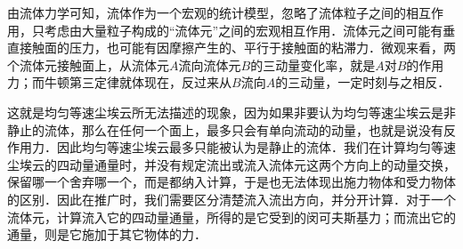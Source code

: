 由流体力学可知，流体作为一个宏观的统计模型，忽略了流体粒子之间的相互作用，只考虑由大量粒子构成的“流体元”之间的宏观相互作用．流体元之间可能有垂直接触面的压力，也可能有因摩擦产生的、平行于接触面的粘滞力．微观来看，两个流体元接触面上，从流体元$A$流向流体元$B$的三动量变化率，就是$A$对$B$的作用力；而牛顿第三定律就体现在，反过来从$B$流向$A$的三动量，一定时刻与之相反．

这就是均匀等速尘埃云所无法描述的现象，因为如果非要认为均匀等速尘埃云是非静止的流体，那么在任何一个面上，最多只会有单向流动的动量，也就是说没有反作用力．因此均匀等速尘埃云最多只能被认为是静止的流体．我们在计算均匀等速尘埃云的四动量通量时，并没有规定流出或流入流体元这两个方向上的动量交换，保留哪一个舍弃哪一个，而是都纳入计算，于是也无法体现出施力物体和受力物体的区别．因此在推广时，我们需要区分清楚流入流出方向，并分开计算．对于一个流体元，计算流入它的四动量通量，所得的是它受到的闵可夫斯基力；而流出它的通量，则是它施加于其它物体的力．










